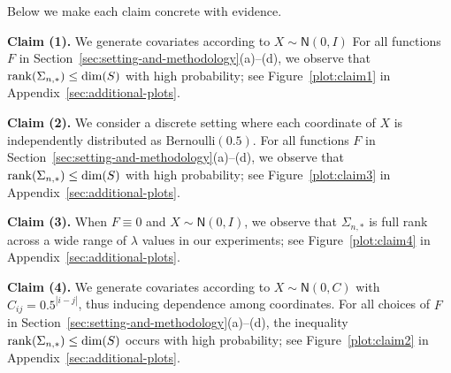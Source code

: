 \documentclass[sn-mathphys-num]{sn-jnl}%
\numberwithin{equation}{section}
\newcommand{\norm}[1]{\left\|{#1}\right\|} %
\newcommand{\normal}{\mathsf{N}}  %
\newcommand{\rank}{{\rm rank}}
\theoremstyle{thmstyleone}%
\theoremstyle{thmstyletwo}%
\theoremstyle{thmstylethree}%
\begin{document}
Below we make each claim concrete with evidence. 

\vspace{.5em}
\noindent\noindent
\textbf{Claim (1).} We generate covariates according to $X \sim \normal(0, I)$ For all functions $F$ in Section~\ref{sec:setting-and-methodology}(a)--(d), we observe that $\rank(\Sigma_{n,*}) \le \dim(S)$ with high probability; see Figure~\ref{plot:claim1} in Appendix~\ref{sec:additional-plots}. 

\vspace{.3cm}
\noindent\noindent
\textbf{Claim (2).} We consider a discrete setting where each coordinate of $X$ is independently distributed as $\mathrm{Bernoulli}(0.5)$. %
For all functions $F$ in Section~\ref{sec:setting-and-methodology}(a)--(d), we observe that $\rank(\Sigma_{n,*}) \le \dim(S)$ with high probability; see Figure~\ref{plot:claim3} in Appendix~\ref{sec:additional-plots}.


\vspace{.3cm}
\noindent\noindent
\textbf{Claim (3).} 
When $F \equiv 0$ and $X \sim \normal(0,I)$, we observe that $\Sigma_{n,*}$ is full rank across a wide range of $\lambda$ values in our experiments; see Figure~\ref{plot:claim4} in Appendix~\ref{sec:additional-plots}.


\vspace{.3cm}
\noindent\noindent
\textbf{Claim (4).} We generate covariates according to $X \sim \normal(0,C)$ with $C_{ij}=0.5^{|i-j|}$, thus inducing dependence among coordinates.
For all choices of $F$ in Section~\ref{sec:setting-and-methodology}(a)--(d), the inequality $\rank(\Sigma_{n, *}) \le \dim(S)$ occurs with high probability; see Figure~\ref{plot:claim2} in Appendix~\ref{sec:additional-plots}.







\end{document}

